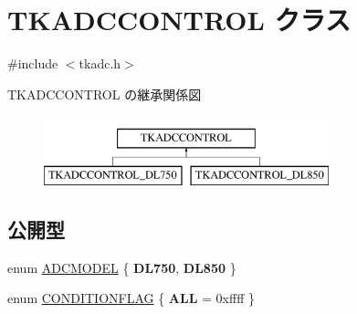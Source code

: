 \hypertarget{class_t_k_a_d_c_c_o_n_t_r_o_l}{}\section{T\+K\+A\+D\+C\+C\+O\+N\+T\+R\+OL クラス}
\label{class_t_k_a_d_c_c_o_n_t_r_o_l}


{\ttfamily \#include $<$tkadc.\+h$>$}

T\+K\+A\+D\+C\+C\+O\+N\+T\+R\+OL の継承関係図\begin{figure}[H]
\begin{center}
\leavevmode
\includegraphics[height=2.000000cm]{class_t_k_a_d_c_c_o_n_t_r_o_l}
\end{center}
\end{figure}
\subsection*{公開型}
\begin{DoxyCompactItemize}
\item 
enum \hyperlink{class_t_k_a_d_c_c_o_n_t_r_o_l_a9a5cfed6c86912f4b9053c8707cf89dd}{A\+D\+C\+M\+O\+D\+EL} \{ {\bfseries D\+L750}, 
{\bfseries D\+L850}
 \}
\item 
enum \hyperlink{class_t_k_a_d_c_c_o_n_t_r_o_l_a4ec8bb3e68a489f7a757d08a855ffb61}{C\+O\+N\+D\+I\+T\+I\+O\+N\+F\+L\+AG} \{ {\bfseries A\+LL} = 0xffff
 \}
\end{DoxyCompactItemize}
